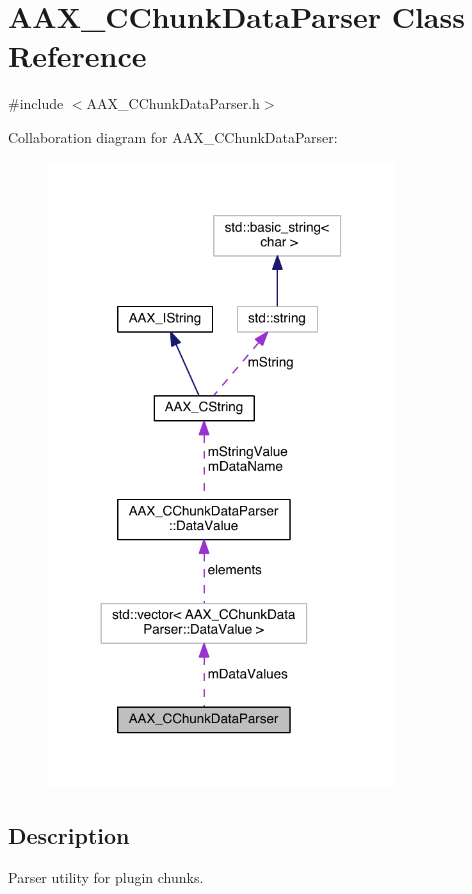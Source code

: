 \hypertarget{a00014}{}\section{A\+A\+X\+\_\+\+C\+Chunk\+Data\+Parser Class Reference}
\label{a00014}


{\ttfamily \#include $<$A\+A\+X\+\_\+\+C\+Chunk\+Data\+Parser.\+h$>$}



Collaboration diagram for A\+A\+X\+\_\+\+C\+Chunk\+Data\+Parser\+:
\nopagebreak
\begin{figure}[H]
\begin{center}
\leavevmode
\includegraphics[width=260pt]{a00404}
\end{center}
\end{figure}


\subsection{Description}
Parser utility for plugin chunks. 


